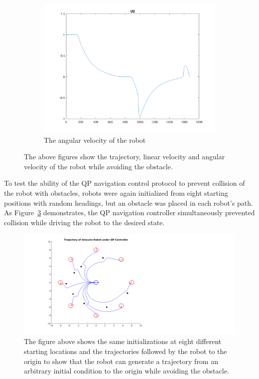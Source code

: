 \documentclass[journal]{IEEEtran}
\begin{document}
\begin{figure}[t!]
\begin{subfigure}[t]{0.32\textwidth}
\includegraphics[scale=0.15]{U2.png} 
\caption{The angular velocity of the robot \label{fig:delta}} 
\end{subfigure}
\caption{The above figures show the trajectory, linear velocity and angular velocity of the robot while avoiding the obstacle.\label{fig:state}}
\end{figure}

To test the ability of the QP navigation control protocol to prevent collision of the robot with obstacles, robots were again initialized from eight starting positions with random headings, but an obstacle was placed in each robot's path. As Figure~\ref{fig:octoplot} demonstrates, the QP navigation controller simultaneously prevented collision while driving the robot to the desired state.


\begin{figure}[h!]
\centering
\includegraphics[scale=0.4]{octoPlotProofEditSqur.png} 
\caption{The figure above shows the same initializations at eight different starting locations and the trajectories followed by the robot to the origin to show that the robot can generate a trajectory from an arbitrary initial condition to the origin while avoiding the obstacle.\label{fig:octoplot}} 
\end{figure}
\end{document}
